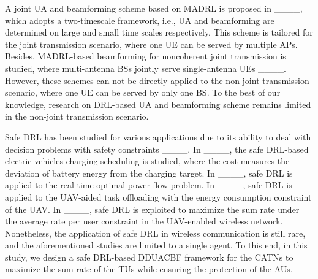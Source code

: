 A joint UA and beamforming scheme based on MADRL is proposed in ____, which adopts a two-timescale framework, i.e., UA and beamforming are determined on large and small time scales respectively.
This scheme is tailored for the joint transmission scenario, where one UE can be served by multiple APs.
Besides, MADRL-based beamforming for noncoherent joint transmission is studied, where multi-antenna BSs jointly serve single-antenna UEs ____.
However, these schemes can not be directly applied to the non-joint transmission scenario, where one UE can be served by only one BS.
To the best of our knowledge, research on DRL-based UA and beamforming scheme remains limited in the non-joint transmission scenario.


Safe DRL has been studied for various applications due to its ability to deal with decision problems with safety constraints ____.
In ____, the safe DRL-based electric vehicles charging scheduling is studied, where the cost measures the deviation of battery energy from the charging target.
In ____, safe DRL is applied to the real-time optimal power flow problem.
In ____, safe DRL is applied to the UAV-aided task offloading with the energy consumption constraint of the UAV.
In ____, safe DRL is exploited to maximize the sum rate under the average rate per user constraint in the UAV-enabled wireless network.
Nonetheless, the application of safe DRL in wireless communication is still rare, and the aforementioned studies are limited to a single agent.
To this end, in this study, we design a safe DRL-based DDUACBF framework for the CATNs to maximize the sum rate of the TUs while ensuring the protection of the AUs.
